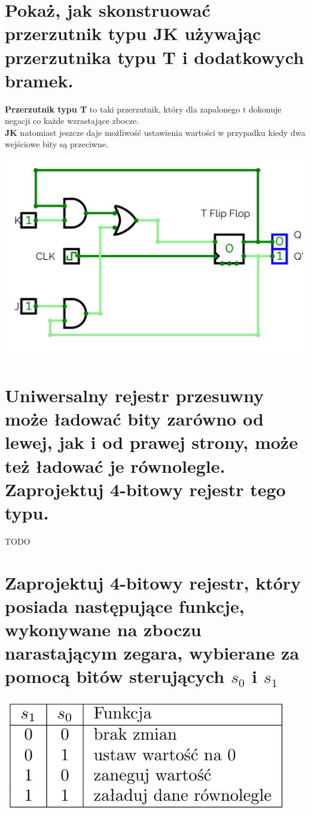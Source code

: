 \documentclass{article}
\begin{document}
\section{Pokaż, jak skonstruować przerzutnik typu JK używając przerzutnika typu T i dodatkowych bramek.}
\textbf{Przerzutnik typu T} to taki przerzutnik, który dla zapalonego t dokonuje negacji co każde wzrastające zbocze.\\
\textbf{JK} natomiast jeszcze daje możliwość ustawienia wartości w przypadku kiedy dwa wejściowe bity są przeciwne.
\begin{center}
\includegraphics[scale=0.3]{./L06Z05.png}
\end{center}
\section{Uniwersalny rejestr przesuwny może ładować bity zarówno od lewej, jak i od prawej strony, może też ładować je równolegle. Zaprojektuj 4-bitowy rejestr tego typu.}
TODO
\section{Zaprojektuj 4-bitowy rejestr, który posiada następujące funkcje, wykonywane na zboczu narastającym zegara, wybierane za pomocą bitów sterujących $s_0$ i $s_1$}
\begin{center}
\includegraphics[scale=0.3]{./L06Z07.png}
\end{center}
\end{document}
